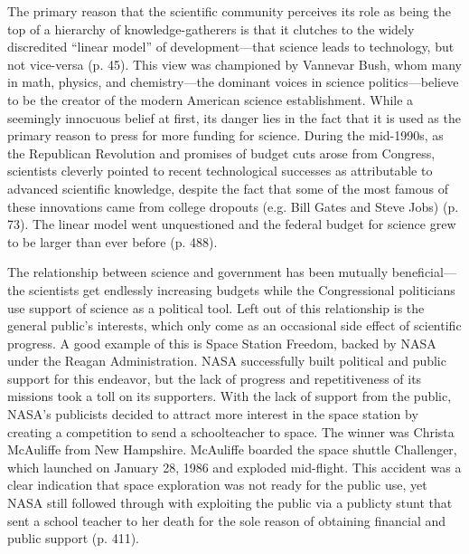 \documentclass{article}[12pt]
\begin{document}
The primary reason that the scientific community perceives its role as being
the top of a hierarchy of knowledge-gatherers is that it clutches to the widely
discredited ``linear model'' of development---that science leads to technology,
but not vice-versa (p. 45). This view was championed by Vannevar Bush, whom
many in math, physics, and chemistry---the dominant voices in science
politics---believe to be the creator of the modern American science
establishment. While a seemingly innocuous belief at first, its danger lies in
the fact that it is used as the primary reason to press for more funding for
science. During the mid-1990s, as the Republican Revolution and promises of
budget cuts arose from Congress, scientists cleverly pointed to recent
technological successes as attributable to advanced scientific knowledge,
despite the fact that some of the most famous of these innovations came from
college dropouts (e.g. Bill Gates and Steve Jobs) (p. 73). The linear model
went unquestioned and the federal budget for science grew to be larger than
ever before (p. 488).

The relationship between science and government has been mutually
beneficial---the scientists get endlessly increasing budgets while the
Congressional politicians use support of science as a political tool. Left out
of this relationship is the general public's interests, which only come as an
occasional side effect of scientific progress. A good example of this is Space
Station Freedom, backed by NASA under the Reagan Administration.  NASA
successfully built political and public support for this endeavor, but the lack
of progress and repetitiveness of its missions took a toll on its supporters.
With the lack of support from the public, NASA's publicists decided to attract
more interest in the space station by creating a competition to send a
schoolteacher to space.  The winner was Christa McAuliffe from New Hampshire.
McAuliffe boarded the space shuttle Challenger, which launched on January 28,
1986 and exploded mid-flight.  This accident was a clear indication that space
exploration was not ready for the public use, yet NASA still followed through
with exploiting the public via a publicty stunt that sent a school teacher to
her death for the sole reason of obtaining financial and public support (p.
411).
\end{document}
